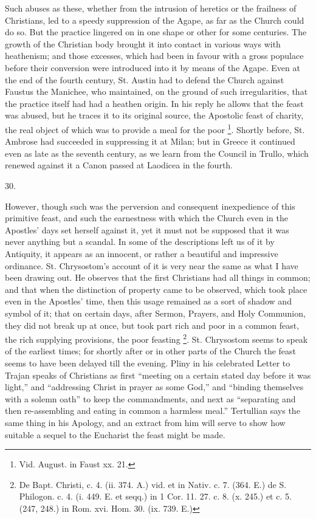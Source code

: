 Such abuses as these, whether from the intrusion
of heretics or the frailness of Christians, led to a speedy
suppression of the Agape, as far as the Church could do so. But the
practice lingered on in one shape or other for some centuries. The
growth of the Christian body brought it into contact in various ways
with heathenism; and those excesses, which had been in favour with a
gross populace before their conversion were introduced into it by
means of the Agape. Even at the end of the fourth century, St. Austin
had to defend the Church against Faustus the Manichee, who maintained,
on the ground of such irregularities, that the practice itself had had
a heathen origin. In his reply he allows that the feast was abused,
but he traces it to its original source, the Apostolic feast of
charity, the real object of which was to provide a meal for the poor \footnote{Vid. August. in Faust xx. 21.}. Shortly before, St. Ambrose had succeeded in suppressing it
at Milan; but in Greece it continued even as late as the seventh
century, as we learn from the Council in Trullo, which renewed against
it a Canon passed at Laodicea in the fourth.

30.

However, though such was the perversion and
consequent inexpedience of this primitive feast, and such the
earnestness with which the Church even in the Apostles' days set
herself against it, yet it must not be supposed that it was never
anything but a scandal. In some of the descriptions left us of it by
Antiquity, it appears as an innocent, or rather a beautiful and
impressive ordinance. St. Chrysostom's account of it is very near the
same as what I have been drawing out. He observes that the first
Christians had all things in common; and that when the distinction of
property came to be observed, which took place even in the Apostles'
time, then this usage remained as a sort of shadow and symbol of it;
that on certain days, after Sermon, Prayers, and Holy Communion, they
did not break up at once, but took part rich and poor in a common
feast, the rich supplying provisions, the poor feasting \footnote{De Bapt. Christi, c. 4. (ii. 374. A.) vid. et in Nativ. c. 7. (364.
E.) de S. Philogon. c. 4. (i. 449. E. et seqq.) in 1 Cor. 11. 27. c.
8. (x. 245.) et c. 5. (247, 248.) in Rom. xvi. Hom. 30. (ix. 739. E.)}. St. Chrysostom seems to speak of the earliest times; for
shortly after or in other parts of the Church the feast seems to have
been delayed till the evening. Pliny in his celebrated Letter to
Trajan speaks of Christians as first ``meeting on a certain stated day
before it was light,'' and ``addressing Christ in prayer as some God,''
and ``binding themselves with a solemn oath'' to keep the commandments,
and next as ``separating and then re-assembling and eating in common a
harmless meal.'' Tertullian says the same thing in his Apology, and an
extract from him will serve to show how suitable a sequel to the
Eucharist the feast might be made.

